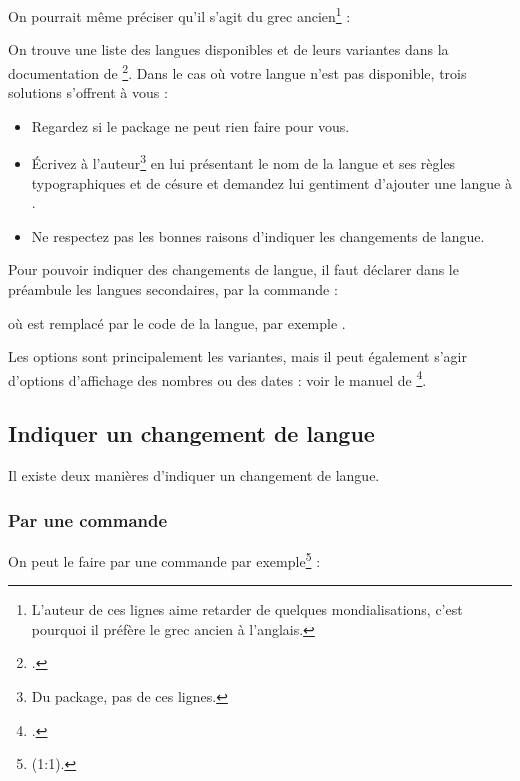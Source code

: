 On pourrait même préciser qu'il s'agit du grec ancien\footnote{L'auteur de ces lignes aime retarder de quelques mondialisations, c'est pourquoi il préfère le grec ancien à l'anglais.} : 

\begin{latexcode}
\setmainlanguage[variant=ancient{greek}
\end{latexcode}


On trouve une liste des langues disponibles et de leurs variantes dans la documentation de \footcite{polyglossia}. Dans le cas où votre langue n'est pas disponible, trois solutions s'offrent à vous :
\begin{itemize}
\item Regardez si le package  ne peut rien faire pour vous. 
\item Écrivez à l'auteur\footnote{Du package, pas de ces lignes.} en lui présentant le nom de la langue et ses règles typographiques et de césure et demandez lui gentiment d'ajouter une langue à .
\item Ne respectez pas les bonnes raisons d'indiquer les changements de langue.
\end{itemize}

Pour pouvoir indiquer des changements de langue, il faut déclarer dans le préambule les langues secondaires, par la commande : 


 où  est remplacé par le code de la langue, par exemple .

Les options sont principalement les variantes, mais il peut également s'agir d'options d'affichage des nombres ou des dates : voir le manuel de \footcite{polyglossia_options}.

\subsection{Indiquer un changement de langue}\label{changerlang}

Il existe deux manières d'indiquer un changement de langue.

\subsubsection{Par une commande}

On peut le faire par une commande 
 par exemple\footnote{(1:1).} : 

